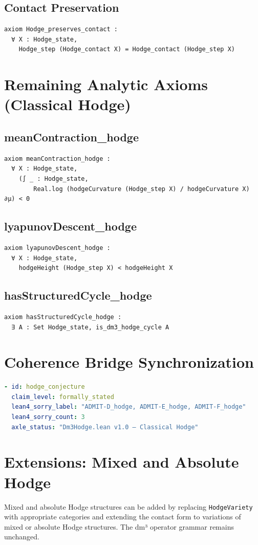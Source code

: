 \documentclass[11pt,a4paper]{article}
\begin{document}
\subsection{Contact Preservation}
\begin{lstlisting}
axiom Hodge_preserves_contact :
  ∀ X : Hodge_state,
    Hodge_step (Hodge_contact X) = Hodge_contact (Hodge_step X)
\end{lstlisting}

\section{Remaining Analytic Axioms (Classical Hodge)}

\subsection{meanContraction\_hodge}
\begin{lstlisting}
axiom meanContraction_hodge :
  ∀ X : Hodge_state,
    (∫ _ : Hodge_state,
        Real.log (hodgeCurvature (Hodge_step X) / hodgeCurvature X) ∂μ) < 0
\end{lstlisting}

\subsection{lyapunovDescent\_hodge}
\begin{lstlisting}
axiom lyapunovDescent_hodge :
  ∀ X : Hodge_state,
    hodgeHeight (Hodge_step X) < hodgeHeight X
\end{lstlisting}

\subsection{hasStructuredCycle\_hodge}
\begin{lstlisting}
axiom hasStructuredCycle_hodge :
  ∃ A : Set Hodge_state, is_dm3_hodge_cycle A
\end{lstlisting}

\section{Coherence Bridge Synchronization}

\begin{lstlisting}[language=YAML]
- id: hodge_conjecture
  claim_level: formally_stated
  lean4_sorry_label: "ADMIT-D_hodge, ADMIT-E_hodge, ADMIT-F_hodge"
  lean4_sorry_count: 3
  axle_status: "Dm3Hodge.lean v1.0 — Classical Hodge"
\end{lstlisting}

\section{Extensions: Mixed and Absolute Hodge}

Mixed and absolute Hodge structures can be added by replacing
\texttt{HodgeVariety} with appropriate categories and extending the
contact form to variations of mixed or absolute Hodge structures.
The dm³ operator grammar remains unchanged.
\end{document}
